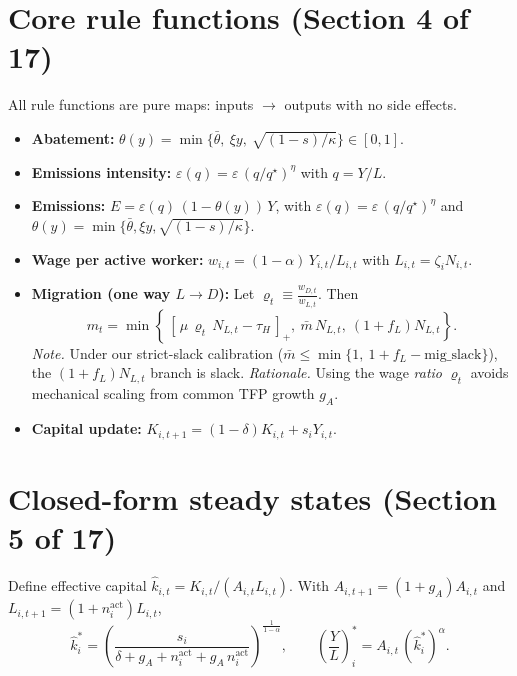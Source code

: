 \documentclass[12pt,a4paper]{article}
\newcommand{\pos}[1]{\ensuremath{\left[ #1 \right]_+}}
\begin{document}
\section{Core rule functions (Section 4 of 17)}
All rule functions are pure maps: inputs \(\to\) outputs with no side effects.
\begin{itemize}[leftmargin=1.25em]
  \item \textbf{Abatement:} \(\theta(y)=\min\{\bar\theta,\ \xi y,\ \sqrt{(1-s)/\kappa}\}\in[0,1]\).
  \item \textbf{Emissions intensity:} \(\varepsilon(q)=\varepsilon\,(q/q^\star)^{\eta}\) with \(q=Y/L\).
  \item \textbf{Emissions:} \(E=\varepsilon(q)\,(1-\theta(y))\,Y\), with \(\varepsilon(q)=\varepsilon\,(q/q^\star)^{\eta}\) and \(\theta(y)=\min\{\bar\theta,\xi y,\sqrt{(1-s)/\kappa}\}\).
  \item \textbf{Wage per active worker:} \(w_{i,t}=(1-\alpha)\,Y_{i,t}/L_{i,t}\) with \(L_{i,t}=\zeta_i N_{i,t}\).
 \item \textbf{Migration (one way \(L\to D\)):}
Let \(\varrho_t\equiv \tfrac{w_{D,t}}{w_{L,t}}\). Then
 \[
m_t=\min\!\left\{\,\pos{\,\mu\,\varrho_t\,N_{L,t}-\tau_H\,},\ \bar m\,N_{L,t},\ (1+f_L)N_{L,t}\right\}.
 \]
\emph{Note.} Under our strict-slack calibration (\(\bar m \le \min\{1,\ 1+f_L-\text{mig\_slack}\}\)), the \((1+f_L)N_{L,t}\) branch is slack.
\newline
\emph{Rationale.} Using the wage \emph{ratio} \(\varrho_t\) avoids mechanical scaling from common TFP growth \(g_A\).

  \item \textbf{Capital update:} \(K_{i,t+1}=(1-\delta)K_{i,t}+s_iY_{i,t}\).
\end{itemize}



\section{Closed-form steady states (Section 5 of 17)}
Define effective capital \(\hat k_{i,t}=K_{i,t}/(A_{i,t}L_{i,t})\). With \(A_{i,t+1}=(1+g_A)A_{i,t}\) and \(L_{i,t+1}=(1+n^{\text{act}}_i)L_{i,t}\),
\begin{equation*}
\hat{k}_i^\ast
= \left(\frac{s_i}{\delta + g_A + n^{\text{act}}_i + g_A\, n^{\text{act}}_i}\right)^{\!\tfrac{1}{1-\alpha}}, 
\qquad
\left(\frac{Y}{L}\right)_{i}^{\!\ast}
= A_{i,t} \, (\hat{k}_i^\ast)^\alpha.
\end{equation*}
\end{document}
